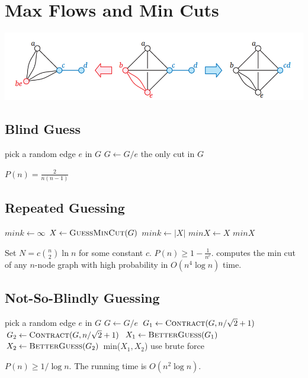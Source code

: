 \section{Max Flows and Min Cuts}
\includegraphics[width=\linewidth]{images/edgecollapse.png}
\subsection{Blind Guess}
\begin{algorithmic}[1]
			\State pick a random edge $e$ in $G$
			\State $G \gets G/e$
		\EndFor
		\State \Return the only cut in $G$
	\EndFunction
\end{algorithmic}
$P(n) = \frac{2}{n(n-1)}$

\subsection{Repeated Guessing}
\begin{algorithmic}[1]
		\State $mink \gets \infty$
			\State $X \gets \Call{GuessMinCut}{G}$
				\State $mink \gets \left|X\right|$
				\State $minX \gets X$
			\EndIf
		\EndFor
		\State \Return $minX$
	\EndFunction
\end{algorithmic}
Set $N = c \binom{n}{2} \ln n$ for some constant $c$. $P(n) \geq 1 - \frac{1}{n^c}$.  computes the min cut of any $n$-node graph with high probability in $O(n^4 \log n)$ time.

\subsection{Not-So-Blindly Guessing}
\begin{algorithmic}[1]
			\State pick a random edge $e$ in $G$
			\State $G \gets G/e$
		\EndFor
	\EndFunction
			\State $G_1 \gets \Call{Contract}{G, n/\sqrt{2} + 1}$
			\State $G_2 \gets \Call{Contract}{G, n/\sqrt{2} + 1}$
			\State $X_1 \gets \Call{BetterGuess}{G_1}$
			\State $X_2 \gets \Call{BetterGuess}{G_2}$
			\State \Return min($X_1, X_2$)
		\Else
			\State use brute force
		\EndIf
	\EndFunction
\end{algorithmic}
$P(n) \geq 1/\log n$. The running time is $O(n^2 \log n)$.

